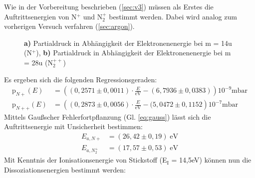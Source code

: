 Wie in der Vorbereitung beschrieben (\ref{sec:v3}) müssen als Erstes die Auftrittsenergien von N$^+$ und N$_2^+$ bestimmt werden. Dabei wird analog zum vorherigen Versuch verfahren (\ref{sec:argon}).\\
\begin{figure}[h]
	\centering
	\caption{\textbf{a)} Partialdruck in Abhängigkeit der Elektronenenergie bei m = 14\;u (N$^+$), \textbf{b)} Partialdruck in Abhängigkeit der Elektronenenergie bei m = 28\;u (N$_2^{++}$)}
	\label{fig:plot_stickstoff}
\end{figure}
Es ergeben sich die folgenden Regressionsgeraden:
\begin{align}
\textrm{p}_{N+}(E) &= \left((0,2571\pm 0,0011)\cdot\frac{E}{\textrm{eV}} - (6,7936\pm 0,0383)\right)10^{-9}\textrm{mbar}\\
\textrm{p}_{N++}(E) &= \left((0,2873\pm 0,0056)\cdot\frac{E}{\textrm{eV}} - (5,0472\pm 0,1152\right)10^{-7}\textrm{mbar}
\end{align}
Mittels Gaußscher Fehlerfortpflanzung (Gl. \ref{eq:gauss}) lässt sich die Auftrittsenergie mit Unsicherheit bestimmen:
\begin{align}
E_{a,N+} &= (26,42\pm 0,19)\;\textrm{eV}\\
E_{a,N_2^+} &= (17,57\pm 0,53)\;\textrm{eV}
\end{align}
Mit Kenntnis der Ionisationsenergie von Stickstoff (E$_\textrm{I}$ = 14,5\;eV) können nun die Dissoziationsenergien bestimmt werden:
